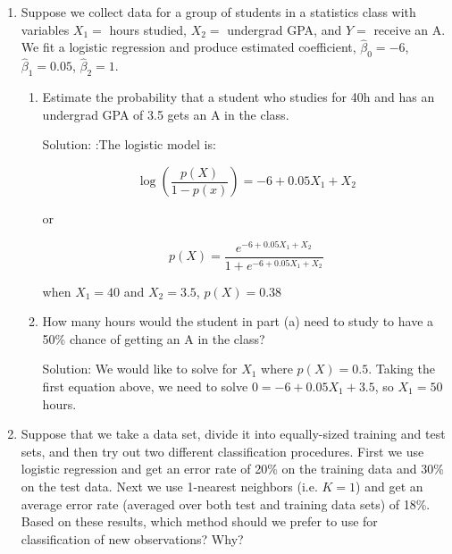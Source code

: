 \documentclass{article}
\begin{document}
\begin{enumerate}
\begin{enumerate}
Note: A hypercube is a generalization of a cube to an arbitrary number of
dimensions. When $p = 1$, a hypercube is simply a line segment, when $p = 2$
it is a square, and when $p = 100$ it is a 100-dimensional cube.

Solution: When $p = 1$, clearly the length is 0.1.
When $p = 2$, we need the value $l$ such that $l^2 = 0.1$, so
$l = \sqrt{0.1} = 0.32$.
When $p = n$, $l = 0.1^{1/n}$, so in the case of $n = 100$, $l = 0.98$.
Therefore, the length of each side of the hypercube rapidly approaches 1
(or 100\%) of the range of each $p$.
\end{enumerate}

\item Suppose we collect data for a group of students in a statistics class with
 variables $X_1 =$ hours studied, $X_2 =$ undergrad GPA, and $Y =$ receive an A.
 We fit a logistic regression and produce estimated coefficient,
 $\hat\beta_0 = -6$, $\hat\beta_1 = 0.05$, $\hat\beta_2 = 1$.

\begin{enumerate}
\item Estimate the probability that a student who studies for 40h and has an
    undergrad GPA of 3.5 gets an A in the class.

Solution: :The logistic model is:

$$
\log\left(\frac{p(X)}{1-p(x)}\right) = -6 + 0.05X_1 + X_2
$$

or

$$
p(X) = \frac{e^{-6 + 0.05X_1 + X_2}}{1 + e^{-6 + 0.05X_1 + X_2}}
$$

when $X_1 = 40$ and $X_2 = 3.5$, $p(X) = 0.38$

\item How many hours would the student in part (a) need to study to have a 50\%
    chance of getting an A in the class?

Solution: We would like to solve for $X_1$ where $p(X) = 0.5$. Taking the first equation
above, we need to solve $0 = -6 + 0.05X_1 + 3.5$, so $X_1 = 50$ hours.
\end{enumerate}

\item Suppose that we take a data set, divide it into equally-sized training and
 test sets, and then try out two different classification procedures. First we
 use logistic regression and get an error rate of 20\% on the training data and
 30\% on the test data. Next we use 1-nearest neighbors (i.e. $K = 1$) and get
 an average error rate (averaged over both test and training data sets) of
 18\%. Based on these results, which method should we prefer to use for
 classification of new observations? Why?


\end{enumerate}
\end{document}
